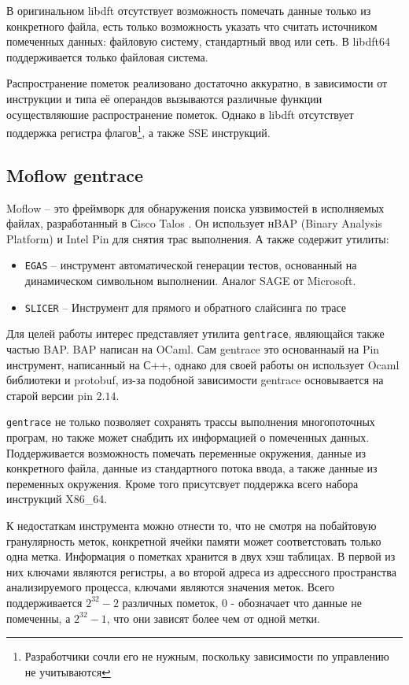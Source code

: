 В оригинальном libdft отсутствует возможность помечать данные только из конкретного файла, есть только возможность указать что считать источником помеченных данных: файловую систему, стандартный ввод или сеть.
В libdft64 поддерживается только файловая система.

Распространение пометок реализовано достаточно аккуратно, в зависимости от инструкции и типа её операндов вызываются различные функции осуществляюшие распространение пометок. Однако в libdft отсутствует поддержка регистра флагов\footnote{Разработчики сочли его не нужным, поскольку зависимости по управлению не учитываются}, а также SSE инструкций.

\subsection{Moflow gentrace}

Moflow -- это фреймворк для обнаружения поиска уязвимостей в исполняемых файлах, разработанный в Сisco Talos \cite{moflow}. Он использует нBAP (Binary Analysis Platform) и Intel Pin для снятия трас выполнения.
А также содержит утилиты:
\begin{itemize}
    \item \texttt{EGAS} -- инструмент автоматической генерации тестов, основанный на динамическом символьном выполнении. Аналог SAGE от Microsoft.
    \item \texttt{SLICER} -- Инструмент для прямого и обратного слайсинга по трасе
\end{itemize}

Для целей работы интерес представляет утилита \texttt{gentrace}, являющайся также частью BAP. BAP написан на OCaml. Сам gentrace это основаннаый на Pin инструмент, написанный на С++, однако для своей работы он использует Ocaml библиотеки и protobuf, из-за подобной зависимости gentrace основывается на старой версии pin $2.14$.

\texttt{gentrace} не только позволяет сохранять трассы выполнения многопоточных програм, но также может снабдить их информацией о помеченных данных. Поддерживается возможность помечать переменные окружения, данные из конкретного файла, данные из стандартного потока ввода, а также данные из переменных окружения.
Кроме того присутсвует поддержка всего набора инструкций X86\_64.

К недостаткам инструмента можно отнести то, что не смотря на побайтовую гранулярность меток, конкретной ячейки памяти может соответстовать только одна метка. Информация о пометках хранится в двух хэш таблицах. В первой из них ключами являются регистры, а во второй адреса из адрессного пространства анализируемого процесса, ключами являются значения меток. Всего поддерживается $2^{32}-2$ различных пометок, $0$ - обозначает что данные не помеченны, а $2^{32} - 1$, что они зависят более чем от одной метки.

